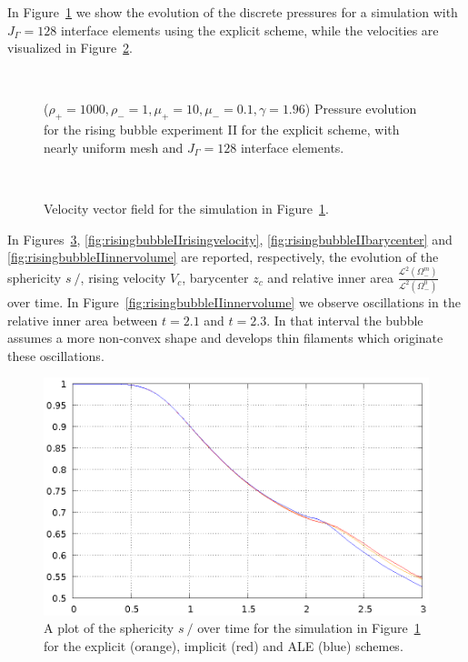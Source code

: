 \documentclass[a4paper,12pt,onecolumn]{article}
\newcommand{\strikes}{\mbox{$s\!\!\!\!\:/$}}
\begin{document}
In Figure~\ref{fig:risingbubbleIIpressure} we show the evolution of the discrete
pressures for a simulation with $J_\Gamma=128$ interface elements using the
explicit scheme, while the velocities are visualized in
Figure~\ref{fig:risingbubbleIIvelocity}.
\begin{figure}[htbp]
\centering
{}
\\
\caption[Navier--Stokes rising bubble II pressure]
{($\rho_+ = 1000,\rho_- = 1,\mu_+ = 10,\mu_- =0.1,\gamma = 1.96$)
Pressure evolution for the rising bubble experiment II for the explicit scheme,
with nearly uniform mesh and $J_\Gamma=128$ interface elements.}
\label{fig:risingbubbleIIpressure}
\end{figure}

\begin{figure}[htbp]
\centering
{}
\\
\caption[Navier--Stokes rising bubble II velocity]
{Velocity vector field for the simulation in
Figure~\ref{fig:risingbubbleIIpressure}.}
\label{fig:risingbubbleIIvelocity}
\end{figure}

In Figures~\ref{fig:risingbubbleIIsphericity},
\ref{fig:risingbubbleIIrisingvelocity}, \ref{fig:risingbubbleIIbarycenter} and
\ref{fig:risingbubbleIIinnervolume} are reported, respectively, the evolution of
the sphericity $\strikes$, rising velocity $V_c$, barycenter $z_c$ and relative
inner area $\frac{\mathcal{L}^2(\Omega^m_-)}{\mathcal{L}^2(\Omega^0_-)}$ over
time. In Figure~\ref{fig:risingbubbleIIinnervolume} we observe oscillations in
the relative inner area between $t=2.1$ and $t=2.3$. In that interval the bubble
assumes a more non-convex shape and develops thin filaments which originate
these oscillations.
\begin{figure}[htbp]
\centering
\includegraphics[width=.45\textwidth]
{figures/rising_bubble_II_sphericity.ps}
\caption[Navier--Stokes rising bubble II sphericity]
{A plot of the sphericity $\strikes$ over time for the simulation in
Figure~\ref{fig:risingbubbleIIpressure} for the explicit (orange), implicit
(red) and ALE (blue) schemes.}
\label{fig:risingbubbleIIsphericity}
\end{figure}
\end{document}
